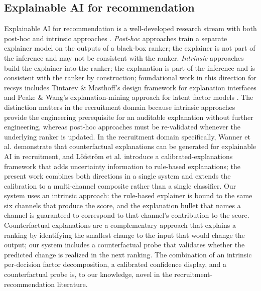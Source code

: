 \subsection{Explainable AI for recommendation}
Explainable AI for recommendation is a well-developed research stream with both post-hoc and intrinsic approaches \citep{miller2019explanation,gunning2017explainable,tintarev2015explaining,peake2018explanation,chen2022explainable}.
\emph{Post-hoc} approaches train a separate explainer model on the outputs of a black-box ranker; the explainer is not part of the inference and may not be consistent with the ranker.
\emph{Intrinsic} approaches build the explainer into the ranker; the explanation is part of the inference and is consistent with the ranker by construction; foundational work in this direction for recsys includes Tintarev \& Masthoff's design framework for explanation interfaces \citep{tintarev2015explaining} and Peake \& Wang's explanation-mining approach for latent factor models \citep{peake2018explanation}.
The distinction matters in the recruitment domain because intrinsic approaches provide the engineering prerequisite for an auditable explanation without further engineering, whereas post-hoc approaches must be re-validated whenever the underlying ranker is updated.
In the recruitment domain specifically, Wanner et al. \citep{wanner2020generating} demonstrate that counterfactual explanations can be generated for explainable AI in recruitment, and L\"ofstr\"om et al. \citep{lofstrom2024calibrated} introduce a calibrated-explanations framework that adds uncertainty information to rule-based explanations; the present work combines both directions in a single system and extends the calibration to a multi-channel composite rather than a single classifier.
Our system uses an intrinsic approach: the rule-based explainer is bound to the same six channels that produce the score, and the explanation bullet that names a channel is guaranteed to correspond to that channel's contribution to the score.
Counterfactual explanations \citep{kaur2020interpreting,wanner2020generating} are a complementary approach that explains a ranking by identifying the smallest change to the input that would change the output; our system includes a counterfactual probe that validates whether the predicted change is realized in the next ranking.
The combination of an intrinsic per-decision factor decomposition, a calibrated confidence display, and a counterfactual probe is, to our knowledge, novel in the recruitment-recommendation literature.


